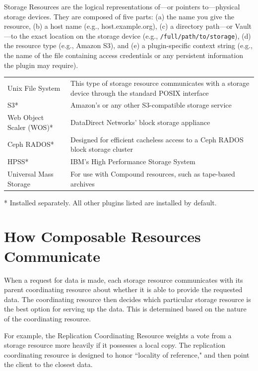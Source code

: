 \documentclass[10pt,oneside]{memoir}
\begin{document}
Storage Resources are the logical representations of---or pointers to---physical storage devices. They are composed of five parts: (a) the name you give the resource, (b) a host name (e.g., host.example.org), (c) a directory path---or Vault---to the exact location on the storage device (e.g., \texttt{/full/path/to/storage}), (d) the resource type (e.g., Amazon S3), and (e) a plugin-specific context string (e.g., the name of the file containing access credentials or any persistent information the plugin may require).

\begin{center}
\def\arraystretch{1.5}%
\begin{tabular}{ |l|p{10cm}| }
\hline
Unix File System & This type of storage resource communicates with a storage device through the standard POSIX interface \\
S3* & Amazon's or any other S3-compatible storage service \\
Web Object Scaler (WOS)* & DataDirect Networks' block storage appliance \\
Ceph RADOS* & Designed for efficient cacheless access to a Ceph RADOS block storage cluster \\
HPSS* & IBM's High Performance Storage System \\
Universal Mass Storage & For use with Compound resources, such as tape-based archives \\
\hline
\end{tabular}
\end{center}
\footnotesize\vspace{-5mm}\hspace{3mm}* Installed separately. All other plugins listed are installed by default.
\normalsize

\section{How Composable Resources Communicate}

When a request for data is made, each storage resource communicates with its parent coordinating resource about whether it is able to provide the requested data. The coordinating resource then decides which particular storage resource is the best option for serving up the data. This is determined based on the nature of the coordinating resource.

For example, the Replication Coordinating Resource weights a vote from a storage resource more heavily if it possesses a local copy. The replication coordinating resource is designed to honor ``locality of reference," and then point the client to the closest data.
\end{document}
